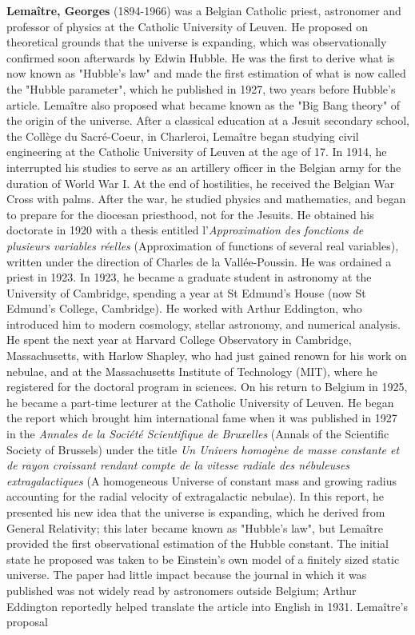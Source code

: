 \textbf{Lemaître, Georges } (1894-1966) was a Belgian Catholic priest, astronomer and professor of physics at the Catholic University of Leuven. He proposed on theoretical grounds that the universe is expanding, which was observationally confirmed soon afterwards by Edwin Hubble. He was the first to derive what is now known as "Hubble's law" and made the first estimation of what is now called the "Hubble parameter", which he published in 1927, two years before Hubble's article. Lemaître also proposed what became known as the "Big Bang theory" of the origin of the universe. After a classical education at a Jesuit secondary school, the Collège du Sacré-Coeur, in Charleroi, Lemaître began studying civil engineering at the Catholic University of Leuven at the age of 17. In 1914, he interrupted his studies to serve as an artillery officer in the Belgian army for the duration of World War I. At the end of hostilities, he received the Belgian War Cross with palms. After the war, he studied physics and mathematics, and began to prepare for the diocesan priesthood, not for the Jesuits. He obtained his doctorate in 1920 with a thesis entitled l'\textit{Approximation des fonctions de plusieurs variables réelles} (Approximation of functions of several real variables), written under the direction of Charles de la Vallée-Poussin. He was ordained a priest in 1923. In 1923, he became a graduate student in astronomy at the University of Cambridge, spending a year at St Edmund's House (now St Edmund's College, Cambridge). He worked with Arthur Eddington, who introduced him to modern cosmology, stellar astronomy, and numerical analysis. He spent the next year at Harvard College Observatory in Cambridge, Massachusetts, with Harlow Shapley, who had just gained renown for his work on nebulae, and at the Massachusetts Institute of Technology (MIT), where he registered for the doctoral program in sciences. On his return to Belgium in 1925, he became a part-time lecturer at the Catholic University of Leuven. He began the report which brought him international fame when it was published in 1927 in the \textit{Annales de la Société Scientifique de Bruxelles} (Annals of the Scientific Society of Brussels) under the title \textit{Un Univers homogène de masse constante et de rayon croissant rendant compte de la vitesse radiale des nébuleuses extragalactiques} (A homogeneous Universe of constant mass and growing radius accounting for the radial velocity of extragalactic nebulae). In this report, he presented his new idea that the universe is expanding, which he derived from General Relativity; this later became known as "Hubble's law", but Lemaître provided the first observational estimation of the Hubble constant. The initial state he proposed was taken to be Einstein's own model of a finitely sized static universe. The paper had little impact because the journal in which it was published was not widely read by astronomers outside Belgium; Arthur Eddington reportedly helped translate the article into English in 1931. Lemaître's proposal 